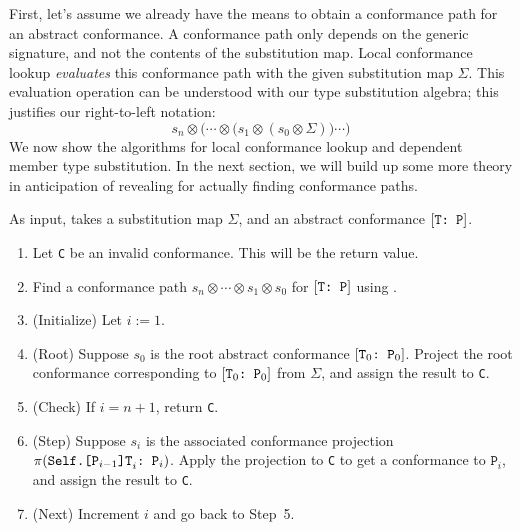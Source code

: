 \documentclass[../generics]{subfiles}
\begin{document}
First, let's assume we already have the means to obtain a conformance path for an abstract conformance. A conformance path only depends on the generic signature, and not the contents of the substitution map. Local conformance lookup \emph{evaluates} this conformance path with the given substitution map $\Sigma$. This evaluation operation can be understood with our type substitution algebra; this justifies our right-to-left notation:
\[s_n\otimes\bigl(\cdots\otimes \bigl(s_1 \otimes (s_0 \otimes \Sigma)\bigr) \cdots \bigr)\]
We now show the algorithms for local conformance lookup and dependent member type substitution. In the next section, we will build up some more theory in anticipation of revealing  for actually finding conformance paths.

\begin{algorithm}\label{local conformance lookup algorithm}
As input, takes a substitution map $\Sigma$, and an abstract conformance $[\texttt{T:~P}]$.
\begin{enumerate}
\item Let \texttt{C} be an invalid conformance. This will be the return value.
\item Find a conformance path $s_n\otimes \cdots \otimes s_1\otimes s_0$ for $[\texttt{T:~P}]$ using .
\item (Initialize) Let $i := 1$.
\item (Root) Suppose $s_0$ is the root abstract conformance $[\texttt{$\texttt{T}_0$:~$\texttt{P}_0$}]$. Project the root conformance corresponding to $[\texttt{$\texttt{T}_0$:~$\texttt{P}_0$}]$ from $\Sigma$, and assign the result to \texttt{C}.
\item (Check) If $i=n+1$, return \texttt{C}.
\item (Step) Suppose $s_i$ is the associated conformance projection $\pi(\texttt{$\texttt{Self.[$\texttt{P}_{i-1}$]T}_i$:~$\texttt{P}_i$})$. Apply the projection to \texttt{C} to get a conformance to $\texttt{P}_i$, and assign the result to \texttt{C}.
\item (Next) Increment $i$ and go back to Step~5.
\end{enumerate}
\end{algorithm}
\end{document}
